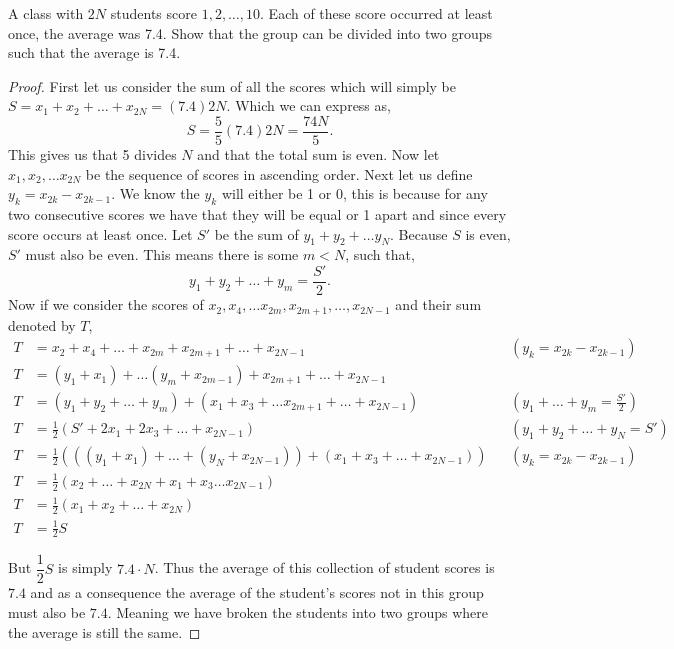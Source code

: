\documentclass[11pt]{article}
\newenvironment{problem}[2][Problem\!]{\begin{trivlist}
\item[\hskip \labelsep {\bfseries #1}\hskip \labelsep {\bfseries #2}]}{\end{trivlist}}
\begin{document}
\newpage
\begin{tcolorbox}
    \begin{problem} {OC | 11/24 | PP21}
        A class with $2N$ students score $1,2, \dots, 10$. Each of these score occurred at least once, the average was 7.4. Show that the group can be divided into two groups such that the average is 7.4.
    \end{problem}
\end{tcolorbox}
\begin{proof}
    First let us consider the sum of all the scores which will simply be $S= x_1 + x_2 + \dots + x_{2N} = (7.4)2N$. Which we can express as,
    \[S = \frac{5}{5}(7.4)2N = \frac{74N}{5}.\]
    This gives us that 5 divides $N$ and that the total sum is even. Now let $x_1, x_2, \dots x_{2N}$ be the sequence of scores in ascending order. Next let us define $y_k = x_{2k} - x_{2k -1}$. We know the $y_k$ will either be 1 or 0, this is because for any two consecutive scores we have that they will be equal or 1 apart and since every score occurs at least once. Let $S'$ be the sum of $y_1 + y_2 + \dots y_N$. Because $S$ is even, $S'$ must also be even. This means there is some $m < N$, such that,
    \[y_1 + y_2 + \dots + y_m = \frac{S'}{2}.\]
    Now if we consider the scores of $x_2,x_4, \dots x_{2m}, x_{2m+1} , \dots,  x_{2N -1 } $ and their sum denoted by $T$,
    \begin{align*}
        T &=x_2 + x_4 + \dots + x_{2m} + x_{2m + 1} + \dots + x_{2N - 1} && \left(y_k = x_{2k} - x_{2k -1}\right) \\
        T &=(y_1 + x_1 ) + \dots (y_m + x_{2m - 1}) + x_{2m + 1} + \dots + x_{2N-1} \\
        T &=(y_1 + y_2 + \dots + y_m) + (x_1 + x_3 + \dots x_{2m+1} + \dots + x_{2N-1}) &&  \left(y_1 + \dots + y_m = \frac{S'}{2}\right) \\
        T &=\frac{1}{2}(S' + 2x_1 + 2x_3 + \dots + x_{2N-1}) &&  \left(y_1 + y_2 + \dots + y_N = S'\right) \\
        T &=\frac{1}{2} (((y_1 + x_1) +  \dots + (y_N + x_{2N - 1})) + (x_1 + x_3 + \dots + x_{2N-1})) && \left(y_k = x_{2k} - x_{2k -1}\right)\\
        T &=\frac{1}{2} (x_2 + \dots + x_{2N} + x_1 + x_3 \dots x_{2N-1}) \\
        T &= \frac{1}{2}(x_1 + x_2 + \dots + x_{2N}) \\
        T &=\frac{1}{2} S
    \end{align*}

    But $\dfrac{1}{2}S$ is simply $7.4 \cdot N$. Thus the average of this collection of student scores is $7.4$ and as a consequence the average of the student's scores not in this group must also be $7.4$. Meaning we have broken the students into two groups where the average is still the same. 
\end{proof}
\end{document}
